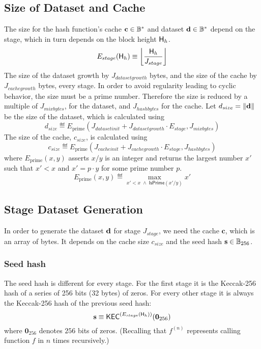 \subsection{Size of Dataset and Cache}
The size for the hash function's cache $\mathbf{c} \in \mathbb{B}^*$  and dataset $\mathbf{d} \in \mathbb{B}^*$ depend on the stage, which in turn depends on the block height $\textsf{H}_{h}$.
\begin{equation} %
 E_{stage}(\head_{h}) \eqdef \left\lfloor\frac{\head_{h}}{J_{stage}}\right\rfloor
\end{equation}
The size of the dataset growth by $J_{datasetgrowth}$ bytes, and the size of the cache by $J_{cachegrowth}$ bytes, every stage. In order to avoid regularity leading to cyclic behavior, the size must be a prime number. Therefore the size is reduced by a multiple of $J_{mixbytes}$, for the dataset, and $J_{hashbytes}$ for the cache.
Let $d_{size} = \lVert\mathbf{d} \rVert$ be the size of the dataset, 
which is calculated using
\begin{equation}
 d_{size} \eqdef E_{\mathrm{prime}}(J_{datasetinit} + J_{datasetgrowth} \cdot E_{stage}, J_{mixbytes})
\end{equation}
The size of the cache, $c_{size}$, is calculated using
\begin{equation}
 c_{size} \eqdef E_{\mathrm{prime}}(J_{cacheinit} + J_{cachegrowth} \cdot E_{stage}, J_{hashbytes})
\end{equation}
where $E_{\mathrm{prime}}(x, y)$ asserts $x/y$ is an integer and returns the largest number $x'$ such that $x'<x$ and $x'=p\cdot y$ for some prime number $p$. 
\begin{equation}
	E_{\mathrm{prime}}(x, y) \eqdef \max_{x'<x\;\wedge\;\mathsf{IsPrime}(x'/y)} x'
\end{equation}
\subsection{Stage Dataset Generation}
In order to generate the dataset $\mathbf{d}$ for stage $J_{stage}$, we need the cache $\mathbf{c}$, which is an array of bytes. It depends on the cache size  $c_{size}$ and the seed hash $\mathbf{s} \in \mathbb{B}_{256}$.
\subsubsection{Seed hash}
The seed hash is different for every stage. For the first stage it is the Keccak-256 hash of a series of 256 bits (32 bytes) of zeros. For every other stage it is always the Keccak-256 hash of the previous seed hash:
\begin{equation}
 \mathbf{s} \equiv \mathsf{KEC}^{(E_{stage}(\textsf{H}_h))}(\mathbf{0}_{256})
\end{equation}
where $\mathbf{0}_{256}$ denotes $256$ bits of zeros. (Recalling that $f^{(n)}$ represents calling function $f$ in $n$ times recursively.)

